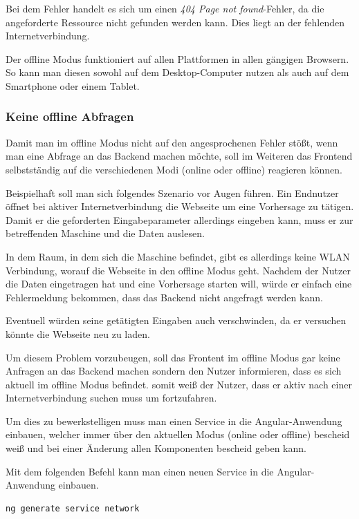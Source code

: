 Bei dem Fehler handelt es sich um einen \textit{404 Page not found}-Fehler, da die angeforderte Ressource nicht gefunden
werden kann. Dies liegt an der fehlenden Internetverbindung.

Der offline Modus funktioniert auf allen Plattformen in allen gängigen Browsern. So kann man diesen sowohl auf dem
Desktop-Computer nutzen als auch auf dem Smartphone oder einem Tablet.

\subsubsection{Keine offline Abfragen}
Damit man im offline Modus nicht auf den angesprochenen Fehler stößt, wenn man eine Abfrage an das Backend machen
möchte, soll im Weiteren das Frontend selbstständig auf die verschiedenen Modi (online oder offline) reagieren können.

Beispielhaft soll man sich folgendes Szenario vor Augen führen. Ein Endnutzer öffnet bei aktiver Internetverbindung die
Webseite um eine Vorhersage zu tätigen. Damit er die geforderten Eingabeparameter allerdings eingeben kann, muss er zur
betreffenden Maschine und die Daten auslesen.

In dem Raum, in dem sich die Maschine befindet, gibt es allerdings keine WLAN Verbindung, worauf die Webseite in den
offline Modus geht. Nachdem der Nutzer die Daten eingetragen hat und eine Vorhersage starten will, würde er einfach
eine Fehlermeldung bekommen, dass das Backend nicht angefragt werden kann.

Eventuell würden seine getätigten Eingaben auch verschwinden, da er versuchen könnte die Webseite neu zu laden.

Um diesem Problem vorzubeugen, soll das Frontent im offline Modus gar keine Anfragen an das Backend machen sondern den
Nutzer informieren, dass es sich aktuell im offline Modus befindet. somit weiß der Nutzer, dass er aktiv nach einer
Internetverbindung suchen muss um fortzufahren.

Um dies zu bewerkstelligen muss man einen Service in die Angular-Anwendung einbauen, welcher immer über den aktuellen
Modus (online oder offline) bescheid weiß und bei einer Änderung allen Komponenten bescheid geben kann.

Mit dem folgenden Befehl kann man einen neuen Service in die Angular-Anwendung einbauen.

\begin{lstlisting}[caption=Hinzufügen eines Services, label=ls:umsetzung_angularaddservice]
    ng generate service network
\end{lstlisting}

